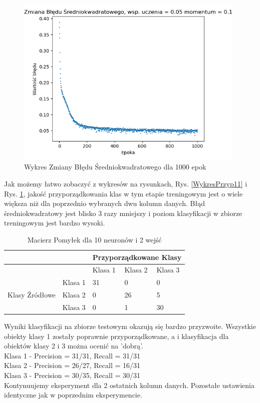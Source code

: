 \documentclass[12pt]{article}
\begin{document}
\newpage

\begin{figure}[!ht]
 \centering
 \includegraphics[width=11cm]{WykresBlad10neuron2wejscia1.png}
 \caption{Wykres Zmiany Błędu Średniokwadratowego dla 1000 epok}
 \vspace{-0.1cm}
 \label{WykresBlad11}
\end{figure}

Jak możemy łatwo zobaczyć z wykresów na rysunkach, Rys. \ref{WykresPrzyp11} i Rys. \ref{WykresBlad11}, jakość przyporządkowania klas w tym etapie treningowym jest o wiele większa niż dla poprzednio wybranych dwu kolumn danych. Błąd średniokwadratowy jest blisko 3 razy mniejszy i poziom klasyfikacji w zbiorze treningowym jest bardzo wysoki.\\
\newpage
\begin{table}
\caption{\label{tab:tablica10} Macierz Pomyłek dla 10 neuronów i 2 wejść}
\begin{tabular}{ |p{3cm}|p{3cm}|p{2cm}|p{2cm}|p{2cm}|  }
 \hline
 & & 
 \multicolumn{3}{|c|}{Przyporządkowane Klasy} \\
 \hline

   & & Klasa 1 & Klasa 2 & Klasa 3\\
 \hline
\multirow{3}{4em}{Klasy Źródłowe}
   & Klasa 1 & 31 & 0 & 0 \\ 
   & Klasa 2 & 0 & 26 & 5 \\
   & Klasa 3 & 0 & 1 & 30 \\

 \hline
\end{tabular}
\end{table}
 
Wyniki klasyfikacji na zbiorze testowym okazują się bardzo przyzwoite. Wszystkie obiekty klasy 1 zostały poprawnie przyporządkowane, a i klasyfikacja dla obiektów klasy 2 i 3 można ocenić na 'dobrą'.
\\Klasa 1 - Precision = 31/31, Recall = 31/31\\
Klasa 2 - Precision = 26/27, Recall = 16/31\\
Klasa 3 - Precision = 30/35, Recall = 30/31\\
\newpage
Kontynuujemy eksperyment dla 2 ostatnich kolumn danych. Pozostałe ustawienia identyczne jak w poprzednim eksperymencie.
\end{document}
